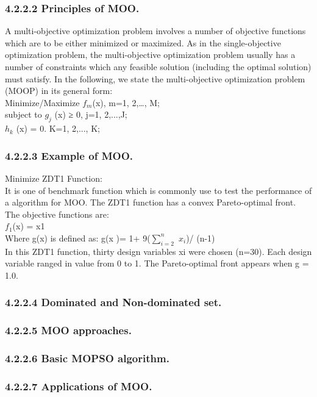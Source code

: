\subsubsection{4.2.2.2 Principles of MOO.}A multi-objective optimization problem involves a number of objective functions which are to be either minimized or maximized. As in the single-objective optimization problem, the multi-objective optimization problem usually has a number of constraints which any feasible solution (including the optimal solution) must satisfy. In the following, we state the multi-objective optimization problem (MOOP) in its general form:\\
				Minimize/Maximize $f_{m}$(x),                    m=1, 2,…, M;\\
				subject to    $g_{j}$ (x) ≥ 0,	                j=1, 2,...,J;\\
							  $h_{k}$ (x) = 0.	                K=1, 2,..., K;\\
\subsubsection{4.2.2.3 Example of MOO.}Minimize ZDT1 Function:  \\
It is one of benchmark function which is commonly use to test the performance of a algorithm for MOO.
The ZDT1 function has a convex Pareto-optimal front. The objective functions are: \\
$f_{1}$(x) = x1\\
Where g(x) is defined as: g(x )= 1+ 9($ $$\sum_{i=2}^{n}$$ $  $x_{i}$)/ (n-1)\\
In this ZDT1 function, thirty design variables xi were chosen (n=30). Each design variable ranged in value from 0 to 1. The Pareto-optimal front appears when g = 1.0.\\
\subsubsection{4.2.2.4 Dominated and Non-dominated set.  }
\subsubsection{4.2.2.5 MOO approaches.}
\subsubsection{4.2.2.6 Basic MOPSO algorithm.}
\subsubsection{4.2.2.7 Applications of MOO.}

